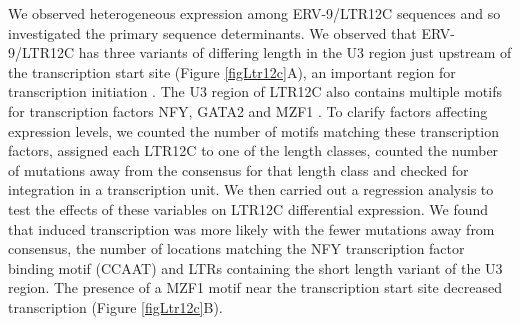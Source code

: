 \documentclass[../sherrill-Mix_thesis.tex]{subfiles}
\begin{document}
		We observed heterogeneous expression among ERV-9/LTR12C sequences and so investigated the primary sequence determinants. We observed that ERV-9/LTR12C has three variants of differing length in the U3 region just upstream of the transcription start site (Figure \ref{figLtr12c}A), an important region for transcription initiation \citep{LaMantia1992}.  The U3 region of LTR12C also contains multiple motifs for transcription factors NFY, GATA2 and MZF1 \citep{Yu2005}. To clarify factors affecting expression levels, we counted the number of motifs matching these transcription factors, assigned each LTR12C to one of the length classes, counted the number of mutations away from the consensus for that length class and checked for integration in a transcription unit. We then carried out a regression analysis to test the effects of these variables on LTR12C differential expression. We found that \hivEight{} induced transcription was more likely with the fewer mutations away from consensus, the number of locations matching the NFY transcription factor binding motif (CCAAT) and LTRs containing the short length variant of the \threePrime{} U3 region. The presence of a MZF1 motif near the transcription start site decreased transcription (Figure \ref{figLtr12c}B). 
		
\end{document}
